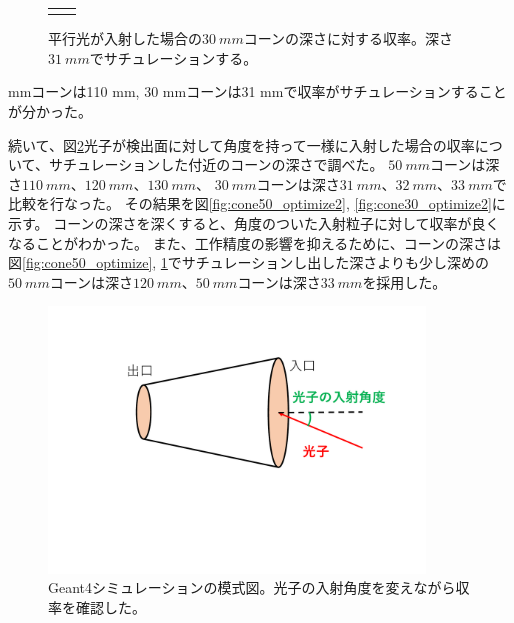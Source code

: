 \begin{figure}[htbp]
\begin{tabular}{cc}
\begin{minipage}[t]{0.45\hsize}
      \caption{平行光が入射した場合の$\SI{30}{mm}$コーンの深さに対する収率。深さ$\SI{31}{mm}$でサチュレーションする。}
      \label{fig:cone30_optimize}
    \end{minipage}
  \end{tabular}
\end{figure}
 mmコーンは110 mm, 30 mmコーンは31 mmで収率がサチュレーションすることが分かった。\\\indent

続いて、図\ref{fig:cone_optimize2}光子が検出面に対して角度を持って一様に入射した場合の収率について、サチュレーションした付近のコーンの深さで調べた。
$\SI{50}{mm}$コーンは深さ$\SI{110}{mm}$、$\SI{120}{mm}$、$\SI{130}{mm}$、
$\SI{30}{mm}$コーンは深さ$\SI{31}{mm}$、$\SI{32}{mm}$、$\SI{33}{mm}$で比較を行なった。
その結果を図\ref{fig:cone50_optimize2}, \ref{fig:cone30_optimize2}に示す。
コーンの深さを深くすると、角度のついた入射粒子に対して収率が良くなることがわかった。
また、工作精度の影響を抑えるために、コーンの深さは図\ref{fig:cone50_optimize}, \ref{fig:cone30_optimize}でサチュレーションし出した深さよりも少し深めの
$\SI{50}{mm}$コーンは深さ$\SI{120}{mm}$、$\SI{50}{mm}$コーンは深さ$\SI{33}{mm}$を採用した。

\begin{figure}
  \centering
  \includegraphics[width=10cm]{images/chapter3/cone_optimize2.pdf}
  \caption{Geant4シミュレーションの模式図。光子の入射角度を変えながら収率を確認した。}
  \label{fig:cone_optimize2}
\end{figure}

